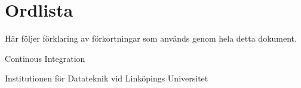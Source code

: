\section*{Ordlista}
Här följer förklaring av förkortningar som används genom hela detta dokument.
\begin{description}[leftmargin=!,labelwidth=\widthof{\bfseries Some text}]
\item[CI] Continous Integration
\item[IDA] Institutionen för Datateknik vid Linköpings Universitet
\end{description}